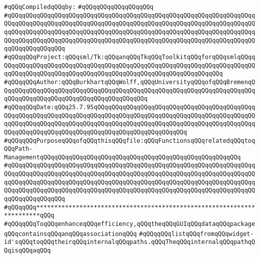 \label{src/lib/tk/src/paths.pkg}
\newline
\verb|#qQQqCompiledqQQqby:|\newline
\verb|#qQQqqQQqqQQqqQQqqQQq|\newline
\newline
\verb|#qQQqqQQqqQQqqQQqqQQqqQQqqQQqqQQqqQQqqQQqqQQqqQQqqQQqqQQqqQQqqQQqqQQqqQQqqQQqqQQqqQQqqQQqqQQqqQQqqQQqqQQqqQQqqQQqqQQqqQQqqQQqqQQqqQQqqQQqqQQqqQQqqQQqqQQqqQQqqQQqqQQqqQQqqQQqqQQqqQQqqQQqqQQqqQQqqQQqqQQqqQQqqQQqqQQqqQQqqQQqqQQqqQQqqQQqqQQqqQQqqQQqqQQqqQQqqQQqqQQqqQQqqQQqqQQqqQQqqQQqqQQqqQQqqQQqqQQq|\newline
\verb|#qQQqqQQqProject:qQQqsml/Tk:qQQqanqQQqTkqQQqToolkitqQQqforqQQqsmlqQQqqQQqqQQqqQQqqQQqqQQqqQQqqQQqqQQqqQQqqQQqqQQqqQQqqQQqqQQqqQQqqQQqqQQqqQQqqQQqqQQqqQQqqQQqqQQqqQQqqQQqqQQqqQQqqQQqqQQqqQQqqQQqqQQqqQQq|\newline
\verb|#qQQqqQQqAuthor:qQQqBurkhartqQQqWolff,qQQqUniversityqQQqofqQQqBremenqQQqqQQqqQQqqQQqqQQqqQQqqQQqqQQqqQQqqQQqqQQqqQQqqQQqqQQqqQQqqQQqqQQqqQQqqQQqqQQqqQQqqQQqqQQqqQQqqQQqqQQqqQQqqQQq|\newline
\verb|#qQQqqQQqDate:qQQq25.7.95qQQqqQQqqQQqqQQqqQQqqQQqqQQqqQQqqQQqqQQqqQQqqQQqqQQqqQQqqQQqqQQqqQQqqQQqqQQqqQQqqQQqqQQqqQQqqQQqqQQqqQQqqQQqqQQqqQQqqQQqqQQqqQQqqQQqqQQqqQQqqQQqqQQqqQQqqQQqqQQqqQQqqQQqqQQqqQQqqQQqqQQqqQQqqQQqqQQqqQQqqQQqqQQqqQQqqQQqqQQqqQQqqQQqqQQqqQQq|\newline
\verb|#qQQqqQQqPurposeqQQqofqQQqthisqQQqfile:qQQqFunctionsqQQqrelatedqQQqtoqQQqPath-ManagementqQQqqQQqqQQqqQQqqQQqqQQqqQQqqQQqqQQqqQQqqQQqqQQqqQQqqQQq|\newline
\verb|#qQQqqQQqqQQqqQQqqQQqqQQqqQQqqQQqqQQqqQQqqQQqqQQqqQQqqQQqqQQqqQQqqQQqqQQqqQQqqQQqqQQqqQQqqQQqqQQqqQQqqQQqqQQqqQQqqQQqqQQqqQQqqQQqqQQqqQQqqQQqqQQqqQQqqQQqqQQqqQQqqQQqqQQqqQQqqQQqqQQqqQQqqQQqqQQqqQQqqQQqqQQqqQQqqQQqqQQqqQQqqQQqqQQqqQQqqQQqqQQqqQQqqQQqqQQqqQQqqQQqqQQqqQQqqQQqqQQqqQQqqQQqqQQqqQQqqQQq|\newline
\verb|#qQQqqQQq***********************************************************************qQQq|\newline
\newline
\newline
\verb|#qQQqqQQqToqQQqenhanceqQQqefficiency,qQQqtheqQQqGUIqQQqdataqQQqpackageqQQqcontainsqQQqanqQQqassociationqQQq|\newline
\verb|#qQQqqQQqlistqQQqfromqQQqwidget-id'sqQQqtoqQQqtheirqQQqinternalqQQqpaths.qQQqTheqQQqinternalqQQqpathqQQqisqQQqaqQQq|\newline
